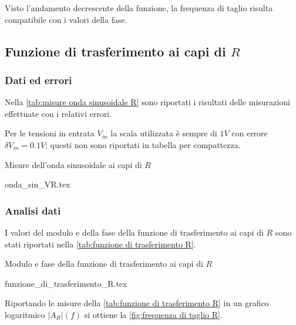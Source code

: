 \documentclass[11pt, a4paper]{article}
\numberwithin{equation}{section} %
\begin{document}
Visto l'andamento decrescente della funzione, la frequenza di taglio risulta compatibile con i valori della fase.

\newpage

\subsection{Funzione di trasferimento ai capi di $R$}

\subsubsection{Dati ed errori}

Nella \autoref{tab:misure onda sinusoidale R} sono riportati i risultati delle misurazioni effettuate con i relativi errori. 

Per le tensioni in entrata $V_{in}$ la scala utilizzata è sempre di $1 V$ con errore $\delta V_{in} = 0.1 V$; questi non sono riportati in tabella per compattezza.

\begin{table}[ht!]
    \centering
    \caption{Misure dell'onda sinusoidale ai capi di $R$}
    {onda_sin_VR.tex}
    \label{tab:misure onda sinusoidale R}
\end{table}


\subsubsection{Analisi dati}

I valori del modulo e della fase della funzione di trasferimento ai capi di $R$ sono stati riportati nella \autoref{tab:funzione di trasferimento R}.

\begin{table}[ht!]
    \centering
    \caption{Modulo e fase della funzione di trasferimento ai capi di $R$}
    {funzione_di_trasferimento_R.tex}
    \label{tab:funzione di trasferimento R}
\end{table}

Riportando le misure della \autoref{tab:funzione di trasferimento R} in un grafico logaritmico $|A_{R}|(f)$ si ottiene la \autoref{fig:frequenza di taglio R}.

\end{document}
